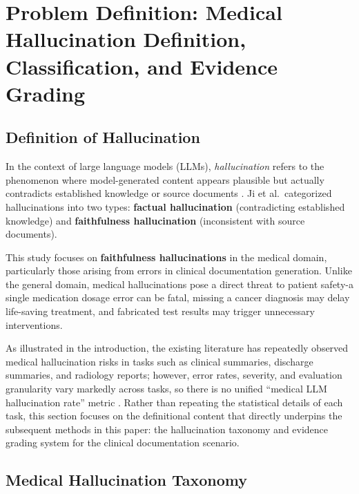 \documentclass[11pt]{article}
\begin{document}
\section{Problem Definition: Medical Hallucination Definition, Classification, and Evidence Grading}
\subsection{Definition of Hallucination}

In the context of large language models (LLMs), \emph{hallucination} refers to the phenomenon where model-generated content appears plausible but actually contradicts established knowledge or source documents \citep{ji2023hallucinationSurvey}. Ji et al.~categorized hallucinations into two types: \textbf{factual hallucination} (contradicting established knowledge) and \textbf{faithfulness hallucination} (inconsistent with source documents).

This study focuses on \textbf{faithfulness hallucinations} in the medical domain, particularly those arising from errors in clinical documentation generation. Unlike the general domain, medical hallucinations pose a direct threat to patient safety-a single medication dosage error can be fatal, missing a cancer diagnosis may delay life-saving treatment, and fabricated test results may trigger unnecessary interventions.

As illustrated in the introduction, the existing literature has repeatedly observed medical hallucination risks in tasks such as clinical summaries, discharge summaries, and radiology reports; however, error rates, severity, and evaluation granularity vary markedly across tasks, so there is no unified ``medical LLM hallucination rate'' metric \citep{pal2023medHalt,ji2023hallucinationSurvey,asgari2025clinicalSafetySummarisation,williams2025dischargeSummaries,artsi2025radiologyReview,zhang2024radFlag}. Rather than repeating the statistical details of each task, this section focuses on the definitional content that directly underpins the subsequent methods in this paper: the hallucination taxonomy and evidence grading system for the clinical documentation scenario.

\subsection{Medical Hallucination Taxonomy}
\end{document}
